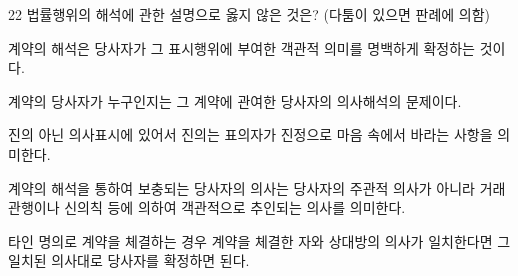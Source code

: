 \begin{question}{22}
법률행위의 해석에 관한 설명으로 옳지 않은 것은? (다툼이 있으면 판례에 의함)
\begin{choices}
  \item 계약의 해석은 당사자가 그 표시행위에 부여한 객관적 의미를 명백하게 확정하는 것이다.
  \item 계약의 당사자가 누구인지는 그 계약에 관여한 당사자의 의사해석의 문제이다.
  \item 진의 아닌 의사표시에 있어서 진의는 표의자가 진정으로 마음 속에서 바라는 사항을 의미한다.
  \item 계약의 해석을 통하여 보충되는 당사자의 의사는 당사자의 주관적 의사가 아니라 거래관행이나 신의칙 등에 의하여 객관적으로 추인되는 의사를 의미한다.
  \item 타인 명의로 계약을 체결하는 경우 계약을 체결한 자와 상대방의 의사가 일치한다면 그 일치된 의사대로 당사자를 확정하면 된다.
\end{choices}
\end{question}

